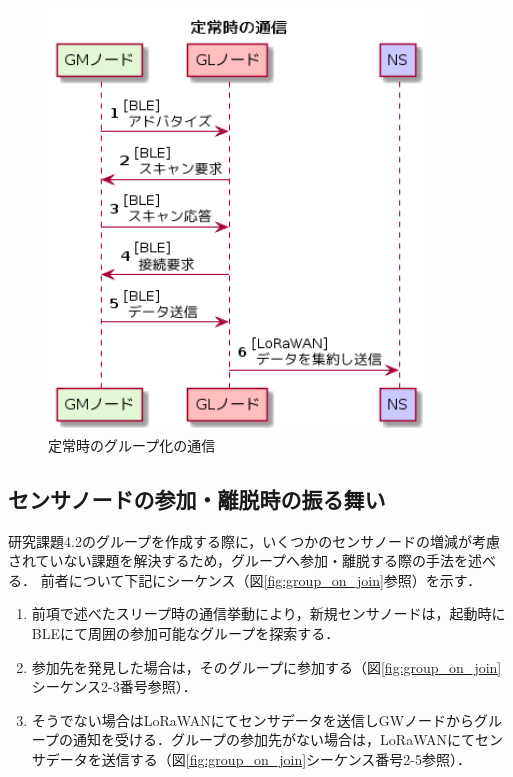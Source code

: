 \begin{figure}[]
    \begin{center}
    \includegraphics[width=10cm]{figures/v2.0/定常時の通信.png}
    \caption{定常時のグループ化の通信}
    \label{fig:default_data_flow}
    \end{center}
\end{figure}

\subsection{センサノードの参加・離脱時の振る舞い}
研究課題4.2のグループを作成する際に，いくつかのセンサノードの増減が考慮されていない課題を解決するため，グループへ参加・離脱する際の手法を述べる．
前者について下記にシーケンス（図\ref{fig:group_on_join}参照）を示す．

\begin{enumerate}
    \item 前項で述べたスリープ時の通信挙動により，新規センサノードは，起動時にBLEにて周囲の参加可能なグループを探索する．
    \item 参加先を発見した場合は，そのグループに参加する（図\ref{fig:group_on_join}シーケンス2-3番号参照）．
    \item そうでない場合はLoRaWANにてセンサデータを送信しGWノードからグループの通知を受ける．グループの参加先がない場合は，LoRaWANにてセンサデータを送信する（図\ref{fig:group_on_join}シーケンス番号2-5参照）．
\end{enumerate}

